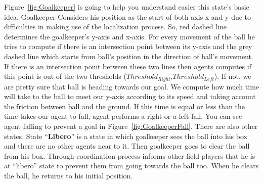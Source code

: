 Figure~\ref{fig:Goalkeeper} is going to help you understand easier this state's basic idea. Goalkeeper Considers his position as the start of both axis x and y due to difficulties in making use of the localization process. So, red dashed line determines the goalkeeper's y-axis and x-axis. For every movement of the ball he tries to compute if there is an intersection point between its y-axis and the grey dashed line which starts from ball's position in the direction of ball's movement. If there is an intersection point between these two lines then agents computes if this point is out of the two thresholds ($Threshold_{Right}$,$Threshold_{Left}$). If not, we are pretty sure that ball is heading towards our goal. We compute how much time will take to the ball to meet our y-axis according to its speed and taking account the friction between ball and the ground. If this time is equal or less than the time takes our agent to fall, agent performs a right or a left fall. You can see agent falling to prevent a goal in Figure~\ref{fig:GoalkeeperFall}. There are also other states. State ``\textbf{Libero}'' is a state in which goalkeeper sees the ball into his box and there are no other agents near to it. Then goalkeeper goes to clear the ball from his box. Through coordination process informs other field players that he is at ``libero'' state to prevent them from going towards the ball too. When he clears the ball, he returns to his initial position. 

